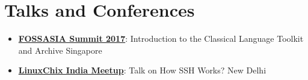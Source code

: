 \documentclass[letterpaper,11pt]{article}
\newcommand{\resumeItem}[2]{
  \item\small{
    \textbf{#1}{: #2 \vspace{-2pt}}
  }
}
\newcommand{\resumeSubItem}[2]{\resumeItem{#1}{#2}\vspace{-4pt}}
\newcommand{\resumeSubHeadingListStart}{\begin{itemize}[leftmargin=*]}
\newcommand{\resumeSubHeadingListEnd}{\end{itemize}}
\begin{document}
\section{Talks and Conferences}
 \resumeSubHeadingListStart
    \resumeSubItem{\href{https://2017.fossasia.org/tracks.html#2891}{FOSSASIA Summit 2017}}
       {Introduction to the Classical Language Toolkit and Archive}\hfill{Singapore}
    \resumeSubItem{\href{https://www.meetup.com/en-AU/LinuxChix-India-Meetup/events/242031500/}{LinuxChix India Meetup}}
       {Talk on How SSH Works?}\hfill{New Delhi}
 \resumeSubHeadingListEnd
\end{document}
